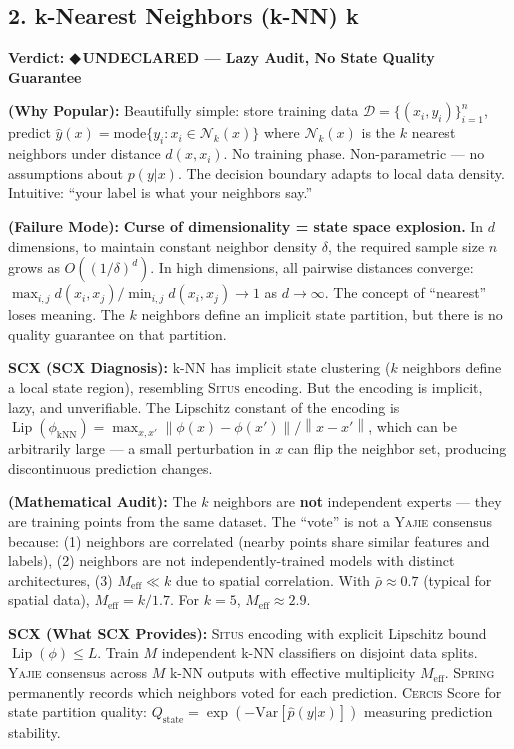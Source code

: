 \documentclass[12pt,a4paper]{article}
\theoremstyle{definition}
\newcommand{\guilty}{{\color{guiltycolor}\textbf{◆\,UNDECLARED}}}
\newcommand{\Situs}{\textsc{Situs}}
\newcommand{\Yajie}{\textsc{Yajie}}
\newcommand{\Spring}{\textsc{Spring}}
\newcommand{\Cercis}{\textsc{Cercis}}
\DeclareMathOperator{\Lip}{Lip}
\newcommand{\cD}{\mathcal{D}}
\newcommand{\cN}{\mathcal{N}}
\newcommand{\norm}[1]{\left\lVert#1\right\rVert}
\newcommand{\auditHeader}[1]{\medskip\noindent\textbf{\large #1}\medskip}
\newcommand{\whyPopular}{\noindent\textbf{ (Why Popular):} }
\newcommand{\whyFail}{\noindent\textbf{ (Failure Mode):} }
\newcommand{\whatMissing}{\noindent\textbf{SCX (What SCX Provides):} }
\newcommand{\diagnosis}{\noindent\textbf{SCX (SCX Diagnosis):} }
\newcommand{\mathAudit}{\noindent\textbf{ (Mathematical Audit):} }
\begin{document}
\subsection{2. k-Nearest Neighbors (k-NN) k}

\auditHeader{Verdict: \guilty{} — Lazy Audit, No State Quality Guarantee}

\whyPopular{} Beautifully simple: store training data $\cD = \{(x_i, y_i)\}_{i=1}^n$, predict $\hat{y}(x) = \text{mode}\{y_i : x_i \in \cN_k(x)\}$ where $\cN_k(x)$ is the $k$ nearest neighbors under distance $d(x, x_i)$. No training phase. Non-parametric — no assumptions about $p(y|x)$. The decision boundary adapts to local data density. Intuitive: ``your label is what your neighbors say.''

\whyFail{} \textbf{Curse of dimensionality = state space explosion.} In $d$ dimensions, to maintain constant neighbor density $\delta$, the required sample size $n$ grows as $O((1/\delta)^d)$. In high dimensions, all pairwise distances converge: $\max_{i,j} d(x_i, x_j) / \min_{i,j} d(x_i, x_j) \to 1$ as $d \to \infty$. The concept of ``nearest'' loses meaning. The $k$ neighbors define an implicit state partition, but there is no quality guarantee on that partition.

\diagnosis{} k-NN has implicit state clustering ($k$ neighbors define a local state region), resembling \Situs{} encoding. But the encoding is implicit, lazy, and unverifiable. The Lipschitz constant of the encoding is $\Lip(\phi_{\text{kNN}}) = \max_{x,x'} \norm{\phi(x) - \phi(x')} / \norm{x - x'}$, which can be arbitrarily large — a small perturbation in $x$ can flip the neighbor set, producing discontinuous prediction changes.

\mathAudit{} The $k$ neighbors are \textbf{not} independent experts — they are training points from the same dataset. The ``vote'' is not a \Yajie{} consensus because: (1) neighbors are correlated (nearby points share similar features and labels), (2) neighbors are not independently-trained models with distinct architectures, (3) $M_{\text{eff}} \ll k$ due to spatial correlation. With $\bar{\rho} \approx 0.7$ (typical for spatial data), $M_{\text{eff}} = k/1.7$. For $k=5$, $M_{\text{eff}} \approx 2.9$.

\whatMissing{} \Situs{} encoding with explicit Lipschitz bound $\Lip(\phi) \le L$. Train $M$ independent k-NN classifiers on disjoint data splits. \Yajie{} consensus across $M$ k-NN outputs with effective multiplicity $M_{\text{eff}}$. \Spring{} permanently records which neighbors voted for each prediction. \Cercis{} Score for state partition quality: $Q_{\text{state}} = \exp(-\text{Var}[\hat{p}(y|x)])$ measuring prediction stability.
\end{document}
